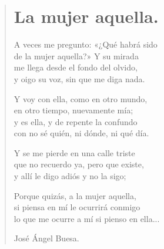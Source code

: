 \documentclass[11pt, portrait, twoside, notitlepage, openright]{book}
\begin{document}
\newpage
\begin{verse}
\begin{center}
\section{La mujer aquella.}
\end{center}
A veces me pregunto: «¿Qué habrá sido\\
de la mujer aquella?» Y su mirada\\
me llega desde el fondo del olvido,\\
y oigo su voz, sin que me diga nada.
\newline

Y voy con ella, como en otro mundo,\\
en otro tiempo, nuevamente mía;\\
y es ella, y de repente la confundo\\
con no sé quién, ni dónde, ni qué día.
\newline

Y se me pierde en una calle triste\\
que no recuerdo ya, pero que existe,\\
y allí le digo adiós y no la sigo;
\newline

Porque quizás, a la mujer aquella,\\
si piensa en mí le ocurrirá conmigo\\
lo que me ocurre a mí si pienso en ella...
\newline

José Ángel Buesa.
\end{verse}
\end{document}
